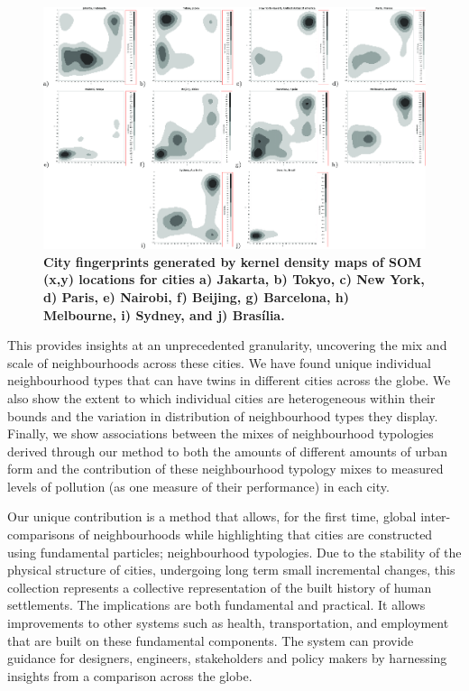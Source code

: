 \documentclass[9pt,twocolumn,twoside,lineno]{pnas-new}
\begin{document}
\begin{figure}
\centering
\includegraphics[trim={0 0 0 0},clip,scale=0.13]{BlockTypologies_Figures2-1.png}
\caption{\bf City fingerprints generated by kernel density maps of SOM (x,y) locations for cities 
a) Jakarta,
b) Tokyo, 
c) New York, 
d) Paris,
e) Nairobi,
f) Beijing, 
g) Barcelona, 
h) Melbourne, 
i) Sydney, and
j) Bras\'{i}lia.
}
 \label{fig:kernel}
\end{figure} 

This provides insights at an unprecedented granularity, uncovering the mix and scale of neighbourhoods across these cities. We have found unique individual neighbourhood types that can have twins in different cities across the globe. We also show the extent to which individual cities are heterogeneous within their bounds and the variation in distribution of neighbourhood types they display. Finally, we show associations between the mixes of neighbourhood typologies derived through our method to both the amounts of different amounts of urban form and the contribution of these neighbourhood typology mixes to measured levels of pollution (as one measure of their performance) in each city. 

Our unique contribution is a method that allows, for the first time, global inter-comparisons of neighbourhoods while highlighting that cities are constructed using fundamental particles; neighbourhood typologies. Due to the stability of the physical structure of cities, undergoing long term small incremental changes\cite{Wegener1986}, this collection represents a collective representation of the built history of human settlements. The implications are both fundamental and practical. It allows improvements to other systems such as health, transportation, and employment that are built on these fundamental components. The system can provide guidance for designers, engineers, stakeholders and policy makers by harnessing insights from a comparison across the globe. 
\end{document}
